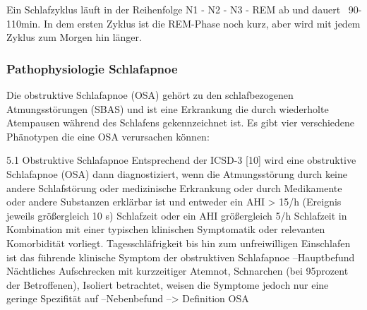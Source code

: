 \documentclass[a4paper, 12pt]{article}
\begin{document}
Ein Schlafzyklus läuft in der Reihenfolge N1 - N2 - N3 - REM ab und dauert ~90-110min. In dem ersten Zyklus ist die REM-Phase noch kurz, aber wird mit jedem Zyklus zum Morgen hin länger.  \cite{phys_sleep_stages}

\cite{schlaf_krizan}

\subsubsection{Pathophysiologie Schlafapnoe}\label{schlafapnoe}
Die obstruktive Schlafapnoe (OSA) gehört zu den schlafbezogenen Atmungsstörungen (SBAS) und ist eine Erkrankung die durch wiederholte Atempausen während des Schlafens gekennzeichnet ist. Es gibt vier verschiedene Phänotypen die eine OSA verursachen können:

5.1 Obstruktive Schlafapnoe
Entsprechend der ICSD-3 [10] wird eine
obstruktive Schlafapnoe (OSA) dann diagnostiziert, wenn die Atmungsstörung
durch keine andere Schlafstörung oder
medizinische Erkrankung oder durch
Medikamente oder andere Substanzen
erklärbar ist und entweder ein AHI >
15/h (Ereignis jeweils größergleich 10 s) Schlafzeit oder ein AHI größergleich 5/h Schlafzeit in
Kombination mit einer typischen klinischen Symptomatik oder relevanten
Komorbidität vorliegt. 
Tagesschläfrigkeit bis hin zum unfreiwilligen Einschlafen ist das führende klinische Symptom der obstruktiven Schlafapnoe --Hauptbefund
Nächtliches Aufschrecken mit kurzzeitiger Atemnot, Schnarchen (bei 95prozent der Betroffenen),  Isoliert betrachtet, weisen die Symptome jedoch nur eine geringe Spezifität auf  --Nebenbefund
--> Definition OSA
\end{document}
